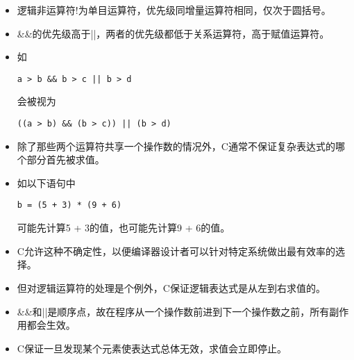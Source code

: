 \begin{frame}[fragile]
\begin{itemize}
\item \tf 
逻辑非运算符!为单目运算符，优先级同增量运算符相同，仅次于圆括号。\\[0.2in]
\item
\&\&的优先级高于||，两者的优先级都低于关系运算符，高于赋值运算符。\\[0.2in]
\item[] 如
\begin{lstlisting}
a > b && b > c || b > d
\end{lstlisting}
会被视为
\begin{lstlisting}
((a > b) && (b > c)) || (b > d)
\end{lstlisting}
\end{itemize}
\end{frame}

\begin{frame}[fragile]
\begin{itemize}\tf
\item 除了那些两个运算符共享一个操作数的情况外，C通常不保证复杂表达式的哪个部分首先被求值。\\[0.2in]
\item [] 
如以下语句中
\begin{lstlisting}
b = (5 + 3) * (9 + 6)
\end{lstlisting}
可能先计算5 + 3的值，也可能先计算9 + 6的值。\\[0.2in]
\item 
C允许这种不确定性，以便编译器设计者可以针对特定系统做出最有效率的选择。
\end{itemize}

\end{frame}


\begin{frame}[fragile]
\begin{itemize}
\item \tf 但对逻辑运算符的处理是个例外，C保证逻辑表达式是从左到右求值的。\\[0.2in]
\item 
\&\&和||是顺序点，故在程序从一个操作数前进到下一个操作数之前，所有副作用都会生效。\\[0.2in]
\item 
\textcolor{acolor1}{C保证一旦发现某个元素使表达式总体无效，求值会立即停止。}
\end{itemize}

\end{frame}


